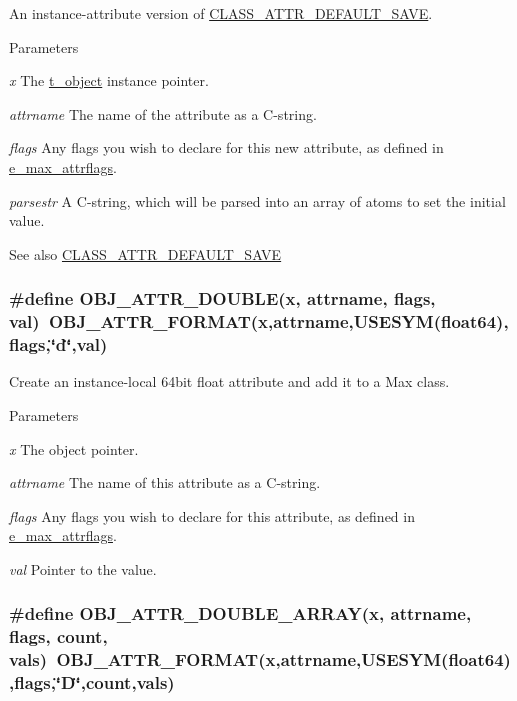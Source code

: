 An instance-\/attribute version of \hyperlink{group__attr_gae34187cee29d0508d00c725ba33c091a}{CLASS\_\-ATTR\_\-DEFAULT\_\-SAVE}. 
\begin{DoxyParams}{Parameters}
\item[{\em x}]The \hyperlink{structt__object}{t\_\-object} instance pointer. \item[{\em attrname}]The name of the attribute as a C-\/string. \item[{\em flags}]Any flags you wish to declare for this new attribute, as defined in \hyperlink{group__attr_gaf296cfc6741bb19207f6ed8062809115}{e\_\-max\_\-attrflags}. \item[{\em parsestr}]A C-\/string, which will be parsed into an array of atoms to set the initial value. \end{DoxyParams}
\begin{DoxySeeAlso}{See also}
\hyperlink{group__attr_gae34187cee29d0508d00c725ba33c091a}{CLASS\_\-ATTR\_\-DEFAULT\_\-SAVE} 
\end{DoxySeeAlso}
\hypertarget{group__attr_ga6a6922fb50714f467415ec838e9509c8}{
\subsubsection[{OBJ\_\-ATTR\_\-DOUBLE}]{\setlength{\rightskip}{0pt plus 5cm}\#define OBJ\_\-ATTR\_\-DOUBLE(x, \/  attrname, \/  flags, \/  val)~OBJ\_\-ATTR\_\-FORMAT(x,attrname,USESYM(float64),flags,\char`\"{}d\char`\"{},val)}}
\label{group__attr_ga6a6922fb50714f467415ec838e9509c8}


Create an instance-\/local 64bit float attribute and add it to a Max class. 
\begin{DoxyParams}{Parameters}
\item[{\em x}]The object pointer. \item[{\em attrname}]The name of this attribute as a C-\/string. \item[{\em flags}]Any flags you wish to declare for this attribute, as defined in \hyperlink{group__attr_gaf296cfc6741bb19207f6ed8062809115}{e\_\-max\_\-attrflags}. \item[{\em val}]Pointer to the value. \end{DoxyParams}
\hypertarget{group__attr_gaf4b7b36b328fb55c890699b82d3e6c1a}{
\subsubsection[{OBJ\_\-ATTR\_\-DOUBLE\_\-ARRAY}]{\setlength{\rightskip}{0pt plus 5cm}\#define OBJ\_\-ATTR\_\-DOUBLE\_\-ARRAY(x, \/  attrname, \/  flags, \/  count, \/  vals)~OBJ\_\-ATTR\_\-FORMAT(x,attrname,USESYM(float64),flags,\char`\"{}D\char`\"{},count,vals)}}
\label{group__attr_gaf4b7b36b328fb55c890699b82d3e6c1a}


